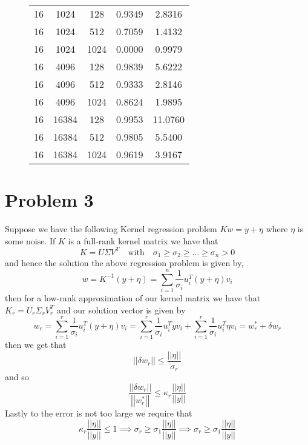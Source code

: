 \documentclass[12pt]{report}
\newcommand{\norm}[1]{\left|\left|#1\right|\right|}
\begin{document}
\begin{figure}[H]
\begin{tabular}{|c|c|c|c|c|}
  16 & 1024 & 128 & 0.9349 & 2.8316 \\
  16 & 1024 & 512 & 0.7059 & 1.4132 \\
  16 & 1024 & 1024 & 0.0000 & 0.9979 \\
  16 & 4096 & 128 & 0.9839 & 5.6222 \\
  16 & 4096 & 512 & 0.9333 & 2.8146 \\
  16 & 4096 & 1024 & 0.8624 & 1.9895 \\
  16 & 16384 & 128 & 0.9953 & 11.0760 \\
  16 & 16384 & 512 & 0.9805 & 5.5400 \\
  16 & 16384 & 1024 & 0.9619 & 3.9167 \\
  \bottomrule
  \end{tabular}
\end{figure}

\section*{Problem 3}
Suppose we have the following Kernel regression problem $Kw = y + \eta$ where $\eta$ is some noise. 
If $K$ is a full-rank kernel matrix we have that
\begin{equation*}
  K = U \Sigma V^T \quad \text{with} \quad \sigma_1 \geq \sigma_2 \geq \ldots \geq \sigma_n > 0
\end{equation*}
and hence the solution the above regression problem is given by,
\begin{equation*}
w = K^{-1}(y + \eta) = \sum_{i=1}^n \frac{1}{\sigma_i} u_i^T(y + \eta) v_i
\end{equation*}
then for a low-rank approximation of our kernel matrix we have that $K_r = U_r \Sigma_r V_r^T$ and our solution vector is given by
\begin{equation*}
  w_r = \sum_{i=1}^r \frac{1}{\sigma_i} u_i^T(y + \eta) v_i = \sum_{i=1}^r \frac{1}{\sigma_i}u_i^Tyv_i + \sum_{i=1}^r \frac{1}{\sigma_i}u_i^T\eta v_i = w_r^* + \delta w_r
\end{equation*}
then we get that 
\begin{equation*}
  \norm{\delta w_r} \leq \frac{\norm{\eta}}{\sigma_r}
\end{equation*}
and so
\begin{equation*}
\frac{\norm{\delta w_r}}{\norm{w_r^*}} \leq \kappa_r \frac{\norm{\eta}}{\norm{y}}
\end{equation*}
Lastly to the error is not too large we require that 
\begin{equation*}
  \kappa_r \frac{\norm{\eta}}{\norm{y}} \leq 1 \implies \sigma_r \geq \sigma_1 \frac{\norm{\eta}}{\norm{y}} \implies \sigma_r \geq \sigma_1\frac{\norm{\eta}}{\norm{y}}
\end{equation*}
\end{document}
